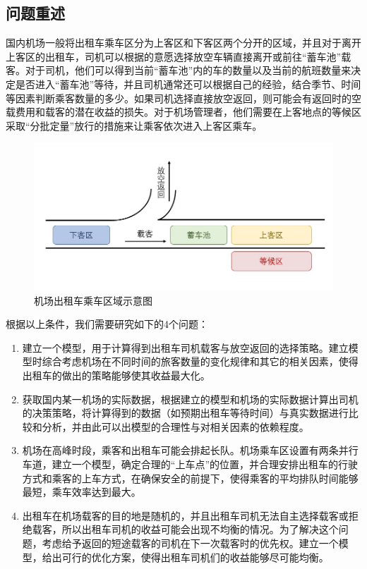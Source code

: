 \documentclass{cumcm}
\begin{document}
\subsection{问题重述}
国内机场一般将出租车乘车区分为上客区和下客区两个分开的区域，并且对于离开上客区的出租车，司机可以根据的意愿选择放空车辆直接离开或前往“蓄车池”载客。对于司机，他们可以得到当前“蓄车池”内的车的数量以及当前的航班数量来决定是否进入“蓄车池”等待，并且司机通常还可以根据自己的经验，结合季节、时间等因素判断乘客数量的多少。如果司机选择直接放空返回，则可能会有返回时的空载费用和载客的潜在收益的损失。对于机场管理者，他们需要在上客地点的等候区采取“分批定量”放行的措施来让乘客依次进入上客区乘车。\par
\begin{figure}[H]
	\centering
	\includegraphics[width=1.0\textwidth]{img/taxi_example.jpg}
	\caption{机场出租车乘车区域示意图}
	\label{taxi_example}
\end{figure}
\newpage
根据以上条件，我们需要研究如下的4个问题：
\begin{enumerate}[(1)]
	\item 建立一个模型，用于计算得到出租车司机载客与放空返回的选择策略。建立模型时综合考虑机场在不同时间的旅客数量的变化规律和其它的相关因素，使得出租车的做出的策略能够使其收益最大化。
	\item 获取国内某一机场的实际数据，根据建立的模型和机场的实际数据计算出司机的决策策略，将计算得到的数据（如预期出租车等待时间）与真实数据进行比较和分析，并由此可以出模型的合理性与对相关因素的依赖程度。
	\item 机场在高峰时段，乘客和出租车可能会排起长队。机场乘车区设置有两条并行车道，建立一个模型，确定合理的“上车点”的位置，并合理安排出租车的行驶方式和乘客的上车方式，在确保安全的前提下，使得乘客的平均排队时间能够最短，乘车效率达到最大。
	\item 出租车在机场载客的目的地是随机的，并且出租车司机无法自主选择载客或拒绝载客，所以出租车司机的收益可能会出现不均衡的情况。为了解决这个问题，考虑给予返回的短途载客的司机在下一次载客时的优先权。建立一个模型，给出可行的优化方案，使得出租车司机们的收益能够尽可能均衡。
\end{enumerate}
\end{document}
